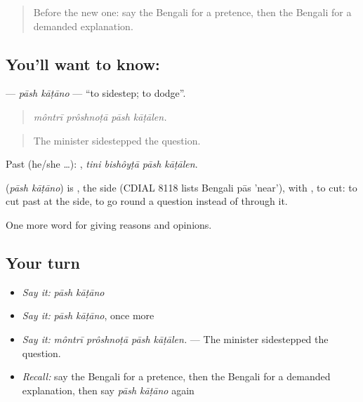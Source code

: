 \label{lesson:BN-C359-pash-katano}



\begin{quote}
Before the new one: say the Bengali for a pretence, then the Bengali for a demanded explanation.
\end{quote}

\subsection*{You'll want to know:  }
\textbf{ } — \emph{pāsh kāṭāno} — \textquotedblleft{}to sidestep; to dodge\textquotedblright{}.

\begin{quote}
   
\end{quote}

\begin{quote}
\emph{môntrī prôshnoṭā pāsh kāṭālen.}
\end{quote}

\begin{quote}
The minister sidestepped the question.
\end{quote}

Past (he/she …):    , \emph{tini bishôyṭā pāsh kāṭālen}.

\begin{cousinweb}
\textbf{ } (\emph{pāsh kāṭāno}) is , the side (CDIAL 8118 lists Bengali pās 'near'), with , to cut: to cut past at the side, to go round a question instead of through it.
\end{cousinweb}

\begin{grammarlens}[title={What you've built}]
One more word for giving reasons and opinions.
\end{grammarlens}

\subsection*{Your turn}
\begin{itemize}
\raggedright
  \item \emph{Say it:} \emph{pāsh kāṭāno}
  \item \emph{Say it:} \emph{pāsh kāṭāno}, once more
  \item \emph{Say it:} \emph{môntrī prôshnoṭā pāsh kāṭālen.} — The minister sidestepped the question.
  \item \emph{Recall:} say the Bengali for a pretence, then the Bengali for a demanded explanation, then say \emph{pāsh kāṭāno} again
\end{itemize}

